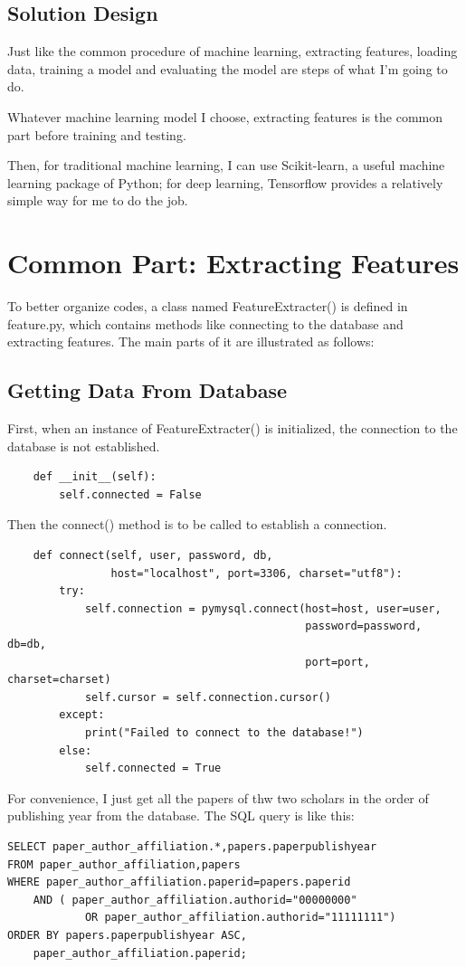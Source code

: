 \documentclass[a4paper]{article}
\begin{document}
        \subsection{Solution Design}
Just like the common procedure of machine learning, extracting features, loading data, training a model and evaluating the model are steps of what I'm going to do.

Whatever machine learning model I choose, extracting features is the common part before training and testing.

Then, for traditional machine learning, I can use Scikit-learn, a useful machine learning package of Python; for deep learning, Tensorflow provides a relatively simple way for me to do the job.
    \newpage
    \section{Common Part: Extracting Features}
To better organize codes, a class named FeatureExtracter() is defined in feature.py, which contains methods like connecting to the database and extracting features. The main parts of it are illustrated as follows:
        \subsection{Getting Data From Database}
First, when an instance of FeatureExtracter() is initialized, the connection to the database is not established.
        \begin{verbatim}
    def __init__(self):
        self.connected = False
        \end{verbatim}
Then the connect() method is to be called to establish a connection.
        \begin{verbatim}
    def connect(self, user, password, db,
                host="localhost", port=3306, charset="utf8"):
        try:
            self.connection = pymysql.connect(host=host, user=user,
                                              password=password, db=db,
                                              port=port, charset=charset)
            self.cursor = self.connection.cursor()
        except:
            print("Failed to connect to the database!")
        else:
            self.connected = True
        \end{verbatim}
For convenience, I just get all the papers of thw two scholars in the order of publishing year from the database. The SQL query is like this:
\begin{verbatim}
SELECT paper_author_affiliation.*,papers.paperpublishyear
FROM paper_author_affiliation,papers
WHERE paper_author_affiliation.paperid=papers.paperid
    AND ( paper_author_affiliation.authorid="00000000"
            OR paper_author_affiliation.authorid="11111111")
ORDER BY papers.paperpublishyear ASC,
    paper_author_affiliation.paperid;
\end{verbatim}
\end{document}
